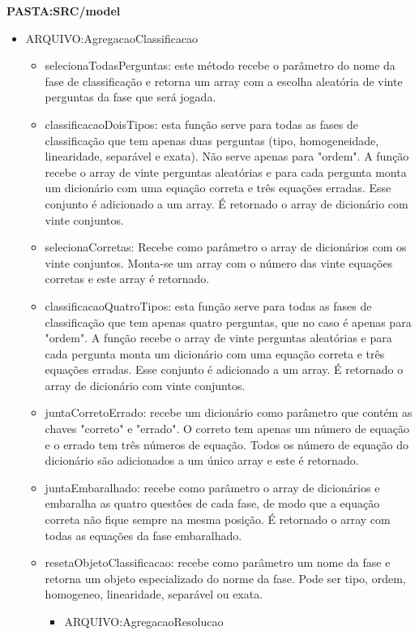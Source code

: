 \textbf{PASTA:SRC/model}
\begin{itemize}
	\item ARQUIVO:AgregacaoClassificacao
	\begin{itemize}
		\item selecionaTodasPerguntas: este método recebe o parâmetro do nome da fase de classificação e retorna um array com a escolha aleatória de vinte perguntas da fase que será jogada.
		\item classificacaoDoisTipos: esta função serve para todas as fases de classificação que tem apenas duas perguntas (tipo, homogeneidade, linearidade, separável e exata). Não serve apenas para "ordem". A função recebe o array de vinte perguntas aleatórias e para cada pergunta monta um dicionário com uma equação correta e três equações erradas. Esse conjunto é adicionado a um array. É retornado o array de dicionário com vinte conjuntos.
		\item selecionaCorretas: Recebe como parâmetro o array de dicionários com os vinte conjuntos. Monta-se um array com o número das vinte equações corretas e este array é retornado.  
		\item classificacaoQuatroTipos: esta função serve para todas as fases de classificação que tem apenas quatro perguntas, que no caso é apenas para "ordem". A função recebe o array de vinte perguntas aleatórias e para cada pergunta monta um dicionário com uma equação correta e três equações erradas. Esse conjunto é adicionado a um array. É retornado o array de dicionário com vinte conjuntos.
		\item juntaCorretoErrado: recebe um dicionário como parâmetro que contém as chaves "correto" e "errado". O correto tem apenas um número de equação e o errado tem três números de equação. Todos os número de equação do dicionário são adicionados a um único array e este é retornado. 
		\item  juntaEmbaralhado: recebe como parâmetro o array de dicionários e embaralha as quatro questôes de cada fase, de modo que a equação correta não fique sempre na mesma posição. É retornado o array com todas as equações da fase embaralhado.
		\item resetaObjetoClassificacao: recebe como parâmetro um nome da fase e retorna um objeto especializado do norme da fase. Pode ser tipo, ordem, homogeneo, linearidade, separável ou exata.
	\begin{itemize}
\end{itemize}

\begin{itemize}
	\item ARQUIVO:AgregacaoResolucao
\end{itemize}


\end{itemize}
\end{itemize}
